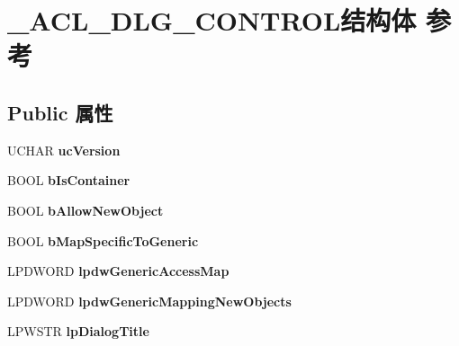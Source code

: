 \hypertarget{struct___a_c_l___d_l_g___c_o_n_t_r_o_l}{}\section{\+\_\+\+A\+C\+L\+\_\+\+D\+L\+G\+\_\+\+C\+O\+N\+T\+R\+O\+L结构体 参考}
\label{struct___a_c_l___d_l_g___c_o_n_t_r_o_l}
\subsection*{Public 属性}
\begin{DoxyCompactItemize}
\item 
\mbox{\label{struct___a_c_l___d_l_g___c_o_n_t_r_o_l_a6518ed094030b9b6f0525d976fd1ef47}} 
U\+C\+H\+AR {\bfseries uc\+Version}
\item 
\mbox{\label{struct___a_c_l___d_l_g___c_o_n_t_r_o_l_a2179764266d84c751081189f52fd13e2}} 
B\+O\+OL {\bfseries b\+Is\+Container}
\item 
\mbox{\label{struct___a_c_l___d_l_g___c_o_n_t_r_o_l_a024809f7e38638ad16e4f5622f070f41}} 
B\+O\+OL {\bfseries b\+Allow\+New\+Object}
\item 
\mbox{\label{struct___a_c_l___d_l_g___c_o_n_t_r_o_l_a3528444090f81f5cedf709c5684a8a2b}} 
B\+O\+OL {\bfseries b\+Map\+Specific\+To\+Generic}
\item 
\mbox{\label{struct___a_c_l___d_l_g___c_o_n_t_r_o_l_af3e6bd5dd8fda830cd9332d51437ed4c}} 
L\+P\+D\+W\+O\+RD {\bfseries lpdw\+Generic\+Access\+Map}
\item 
\mbox{\label{struct___a_c_l___d_l_g___c_o_n_t_r_o_l_a624e8395adffff0d5572804ab10ddc76}} 
L\+P\+D\+W\+O\+RD {\bfseries lpdw\+Generic\+Mapping\+New\+Objects}
\item 
\mbox{\label{struct___a_c_l___d_l_g___c_o_n_t_r_o_l_ae9858d7bbd5747bd3ca47d8df68938bb}} 
L\+P\+W\+S\+TR {\bfseries lp\+Dialog\+Title}

\end{DoxyCompactItemize}
